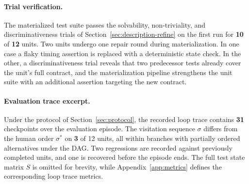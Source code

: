 \paragraph{Trial verification.}
The materialized test suite passes the solvability, non-triviality, and discriminativeness trials of Section~\ref{sec:description-refine} on the first run for \textbf{10} of \textbf{12} units. Two units undergo one repair round during materialization. In one case a flaky timing assertion is replaced with a deterministic state check. In the other, a discriminativeness trial reveals that two predecessor tests already cover the unit's full contract, and the materialization pipeline strengthens the unit suite with an additional assertion targeting the new contract.

\paragraph{Evaluation trace excerpt.}

Under the protocol of Section~\ref{sec:protocol}, the recorded loop trace contains \textbf{31} checkpoints over the evaluation episode. The visitation sequence $\sigma$ differs from the human order $\sigma^*$ on \textbf{3} of 12 units, all within branches with partially ordered alternatives under the DAG. Two regressions are recorded against previously completed units, and one is recovered before the episode ends. The full test state matrix $S$ is omitted for brevity, while Appendix~\ref{app:metrics} defines the corresponding loop trace metrics.
\FloatBarrier
